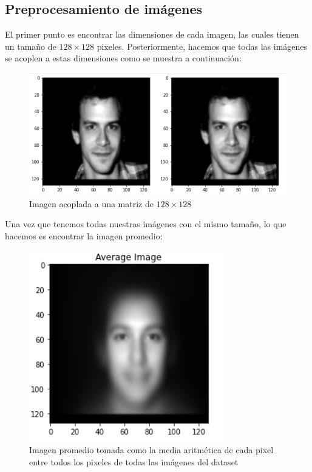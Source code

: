 \documentclass[conference]{IEEEtran}
\begin{document}
\subsection{Preprocesamiento de imágenes}
El primer punto es encontrar las dimensiones de cada imagen, las cuales tienen un tamaño de $128\times 128$ pixeles. Posteriormente, hacemos que todas las imágenes se acoplen a estas dimensiones como se muestra a continuación: 

\begin{figure}[H]
    \centering
    \includegraphics[scale=0.2]{imgs/centered_images.png}
    \caption{Imagen acoplada a una matriz de $128\times 128$}
    \label{fig:faces_centered}
\end{figure}

Una vez que tenemos todas nuestras imágenes con el mismo tamaño, lo que hacemos es encontrar la imagen promedio:

\begin{figure}[H]
    \centering
    \includegraphics[scale=0.25]{imgs/avg_img.png}
    \caption{Imagen promedio tomada como la media aritmética de cada pixel entre todos los pixeles de todas las imágenes del dataset}
    \label{fig:avg_face}
\end{figure}
\end{document}
